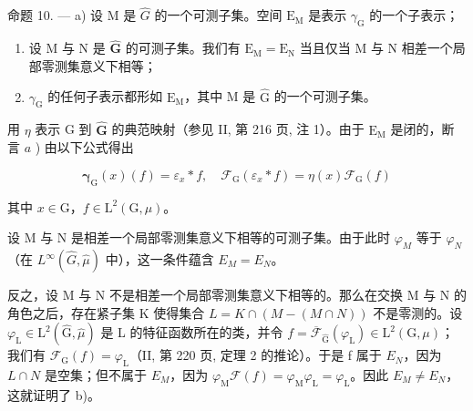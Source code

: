 命题 10. --- a) 设 M 是 \(\widehat{G}\) 的一个可测子集。空间 \(\mathrm{E}_{\mathrm{M}}\) 是表示 \(\gamma_{\mathrm{G}}\) 的一个子表示；

\begin{enumerate}
\def\labelenumi{\alph{enumi})}
\setcounter{enumi}{1}
\item
  设 M 与 N 是 \(\widehat{\mathbf{G}}\) 的可测子集。我们有 \(\mathrm{E_M} = \mathrm{E_N}\) 当且仅当 M 与 N 相差一个局部零测集意义下相等；
\item
  \(\gamma_{\mathrm{G}}\) 的任何子表示都形如 \(\mathrm{E}_{\mathrm{M}}\)，其中 M 是 \(\widehat{\mathrm{G}}\) 的一个可测子集。
\end{enumerate}

用 \(\eta\) 表示 G 到 \(\widehat{\mathbf{G}}\) 的典范映射（参见 II, 第 216 页, 注 1）。由于 \(\mathrm{E_M}\) 是闭的，断言 \(a\) ) 由以下公式得出

\[
\boldsymbol {\gamma} _ {\mathrm{G}} (x) (f) = \varepsilon_ {x} * f, \quad \mathcal {F} _ {\mathrm{G}} (\varepsilon_ {x} * f) = \eta (x) \mathcal {F} _ {\mathrm{G}} (f)
\]

其中 \(x\in \mathrm{G}\)，\(f\in \mathrm{L}^2 (\mathrm{G},\mu)\)。

设 M 与 N 是相差一个局部零测集意义下相等的可测子集。由于此时 \(\varphi_{M}\) 等于 \(\varphi_{N}\)（在 \(L^{\infty}(\widehat{G},\widehat{\mu})\) 中），这一条件蕴含 \(E_{M}=E_{N}\)。

反之，设 M 与 N 不是相差一个局部零测集意义下相等的。那么在交换 M 与 N 的角色之后，存在紧子集 K 使得集合 \(L = K \cap (M - (M \cap N))\) 不是零测的。设 \(\varphi_{\mathrm{L}} \in \mathrm{L}^{2}(\widehat{\mathrm{G}}, \widehat{\mu})\) 是 L 的特征函数所在的类，并令 \(f = \overline{\mathcal{F}}_{\widehat{\mathrm{G}}}(\varphi_{\mathrm{L}}) \in \mathrm{L}^{2}(\mathrm{G}, \mu)\)；我们有 \(\mathcal{F}_{\mathrm{G}}(f) = \varphi_{\mathrm{L}}\)（II, 第 220 页, 定理 2 的推论）。于是 f 属于 \(E_{N}\)，因为 \(L \cap N\) 是空集；但不属于 \(E_{M}\)，因为 \(\varphi_{\mathrm{M}}\mathcal{F}(f) = \varphi_{\mathrm{M}}\varphi_{\mathrm{L}} = \varphi_{\mathrm{L}}\)。因此 \(E_{M} \neq E_{N}\)，这就证明了 b)。

